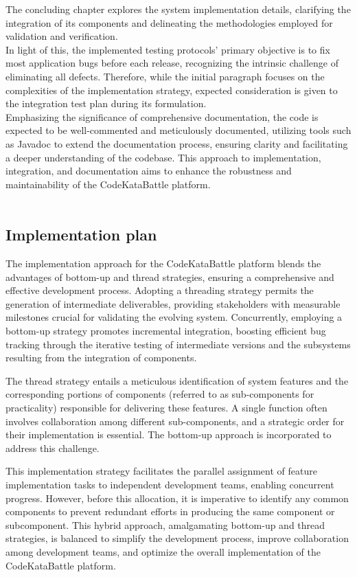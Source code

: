The concluding chapter explores the system implementation details, clarifying the integration of its components and delineating the methodologies employed for validation and verification. \\
In light of this, the implemented testing protocols' primary objective is to fix most application bugs before each release, recognizing the intrinsic challenge of eliminating all defects. Therefore, while the initial paragraph focuses on the complexities of the implementation strategy, expected consideration is given to the integration test plan during its formulation. \\
Emphasizing the significance of comprehensive documentation, the code is expected to be well-commented and meticulously documented, utilizing tools such as Javadoc to extend the documentation process, ensuring clarity and facilitating a deeper understanding of the codebase. This approach to implementation, integration, and documentation aims to enhance the robustness and maintainability of the CodeKataBattle platform. \\ \\

\subsection{Implementation plan}
The implementation approach for the CodeKataBattle platform blends the advantages of bottom-up and thread strategies, ensuring a comprehensive and effective development process. Adopting a threading strategy permits the generation of intermediate deliverables, providing stakeholders with measurable milestones crucial for validating the evolving system. Concurrently, employing a bottom-up strategy promotes incremental integration, boosting efficient bug tracking through the iterative testing of intermediate versions and the subsystems resulting from the integration of components.

The thread strategy entails a meticulous identification of system features and the corresponding portions of components (referred to as sub-components for practicality) responsible for delivering these features. A single function often involves collaboration among different sub-components, and a strategic order for their implementation is essential. The bottom-up approach is incorporated to address this challenge.

This implementation strategy facilitates the parallel assignment of feature implementation tasks to independent development teams, enabling concurrent progress. However, before this allocation, it is imperative to identify any common components to prevent redundant efforts in producing the same component or subcomponent. This hybrid approach, amalgamating bottom-up and thread strategies, is balanced to simplify the development process, improve collaboration among development teams, and optimize the overall implementation of the CodeKataBattle platform.

